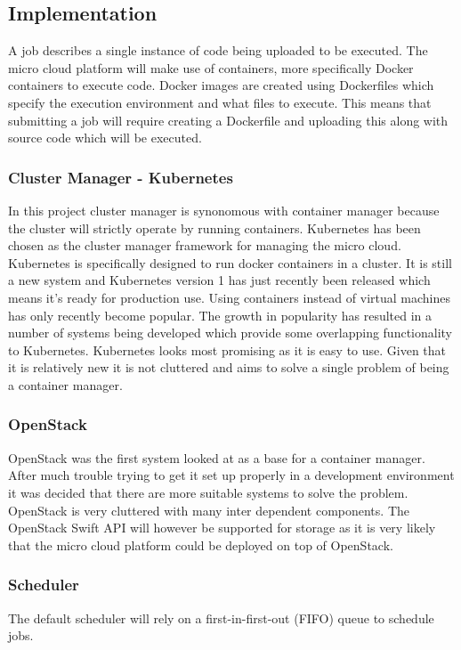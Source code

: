 \documentclass{sig-alternate-05-2015}
\begin{document}
\subsection{Implementation}


A job describes a single instance of code being uploaded to be executed. 
The micro cloud platform will make use of containers, more specifically Docker containers to execute code. Docker images are created using Dockerfiles which specify the execution environment and what files to execute. This means that submitting a job will require creating a Dockerfile and uploading this along with source code which will be executed. 

\subsubsection{Cluster Manager - Kubernetes}
In this project cluster manager is synonomous with container manager because the cluster will strictly operate by running containers. Kubernetes has been chosen as the cluster manager framework for managing the micro cloud. Kubernetes is specifically designed to run docker containers in a cluster. It is still a new system and Kubernetes version 1 has just recently been released which means it's ready for production use. Using containers instead of virtual machines has only recently become popular. The growth in popularity has resulted in a number of systems being developed which provide some overlapping functionality to Kubernetes. Kubernetes looks most promising as it is easy to use. Given that it is relatively new it is not cluttered and aims to solve a single problem of being a container manager. 

\subsubsection{OpenStack}
OpenStack was the first system looked at as a base for a container manager. After much trouble trying to get it set up properly in a development environment it was decided that there are more suitable systems to solve the problem. OpenStack is very cluttered with many inter dependent components. The OpenStack Swift API will however be supported for storage as it is very likely that the micro cloud platform could be deployed on top of OpenStack.


\subsubsection{Scheduler}
The default scheduler will rely on a first-in-first-out (FIFO) queue to schedule jobs.
\end{document}
